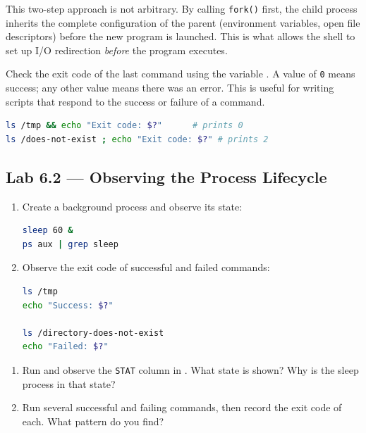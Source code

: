 This two-step approach is not arbitrary. By calling \texttt{fork()} first, the
child process inherits the complete configuration of the parent (environment
variables, open file descriptors) before the new program is launched. This is
what allows the shell to set up I/O redirection \textit{before} the program
executes.

\begin{tipbox}
  Check the exit code of the last command using the variable . A
  value of \texttt{0} means success; any other value means there was an error.
  This is useful for writing scripts that respond to the success or failure of
  a command.
\begin{lstlisting}[language=bash]
ls /tmp && echo "Exit code: $?"      # prints 0
ls /does-not-exist ; echo "Exit code: $?" # prints 2
\end{lstlisting}
\end{tipbox}

\subsection*{Lab 6.2 --- Observing the Process Lifecycle}

\begin{enumerate}
  \item Create a background process and observe its state:
\begin{lstlisting}[language=bash, caption={Observing process state}]
sleep 60 &
ps aux | grep sleep
\end{lstlisting}

  \item Observe the exit code of successful and failed commands:
\begin{lstlisting}[language=bash, caption={Observing exit codes}]
ls /tmp
echo "Success: $?"

ls /directory-does-not-exist
echo "Failed: $?"
\end{lstlisting}
\end{enumerate}

\begin{exercisebox}[6.2]
  \begin{enumerate}
    \item Run  and observe the \texttt{STAT} column in
      . What state is shown? Why is the sleep process in that
      state?
    \item Run several successful and failing commands, then record the exit
      code of each. What pattern do you find?
  \end{enumerate}
\end{exercisebox}

